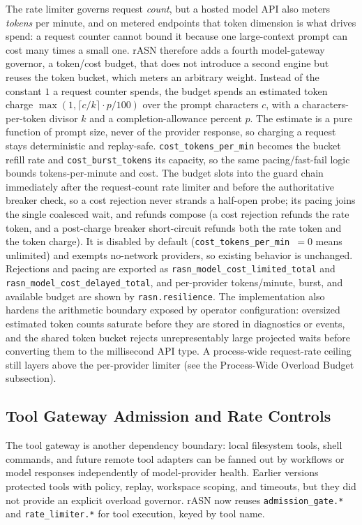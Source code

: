 \documentclass[manuscript,screen,review]{acmart}
\newcommand{\rasn}{rASN\xspace}
\begin{document}
The rate limiter governs request \emph{count}, but a hosted model API also meters
\emph{tokens} per minute, and on metered endpoints that token dimension is what
drives spend: a request counter cannot bound it because one large-context prompt
can cost many times a small one. \rasn therefore adds a fourth model-gateway
governor, a token/cost budget, that does not introduce a second engine but reuses
the token bucket, which meters an arbitrary weight. Instead of the constant $1$ a
request counter spends, the budget spends an estimated token charge
$\max(1, \lceil c / k \rceil \cdot p / 100)$ over the prompt characters $c$, with a
characters-per-token divisor $k$ and a completion-allowance percent $p$. The
estimate is a pure function of prompt size, never of the provider response, so
charging a request stays deterministic and replay-safe. \texttt{cost\_tokens\_per\_min}
becomes the bucket refill rate and \texttt{cost\_burst\_tokens} its capacity, so the
same pacing/fast-fail logic bounds tokens-per-minute and cost. The budget slots into
the guard chain immediately after the request-count rate limiter and before the
authoritative breaker check, so a cost rejection never strands a half-open probe;
its pacing joins the single coalesced wait, and refunds compose (a cost rejection
refunds the rate token, and a post-charge breaker short-circuit refunds both the
rate token and the token charge). It is disabled by default
(\texttt{cost\_tokens\_per\_min}~$=0$ means unlimited) and exempts no-network
providers, so existing behavior is unchanged. Rejections and pacing are exported as
\texttt{rasn\_model\_cost\_limited\_total} and
\texttt{rasn\_model\_cost\_delayed\_total}, and per-provider tokens/minute, burst,
and available budget are shown by \texttt{rasn.resilience}. The implementation also
hardens the arithmetic boundary exposed by operator configuration: oversized
estimated token counts saturate before they are stored in diagnostics or events,
and the shared token bucket rejects unrepresentably large projected waits before
converting them to the millisecond API type. A process-wide
request-rate ceiling still layers above the per-provider limiter (see the
Process-Wide Overload Budget subsection).

\subsection{Tool Gateway Admission and Rate Controls}

The tool gateway is another dependency boundary: local filesystem tools, shell
commands, and future remote tool adapters can be fanned out by workflows or model
responses independently of model-provider health. Earlier versions protected tools
with policy, replay, workspace scoping, and timeouts, but they did not provide an
explicit overload governor. \rasn now reuses \texttt{admission\_gate.*} and
\texttt{rate\_limiter.*} for tool execution, keyed by tool name.
\end{document}
